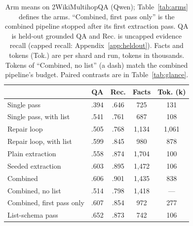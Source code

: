\begin{table}[!tb]
\centering
\caption{Arm means on 2WikiMultihopQA (Qwen); Table~\ref{tab:arms} defines the arms. ``Combined, first pass only'' is the combined pipeline stopped after its first extraction pass. QA is held-out grounded QA and Rec. is uncapped evidence recall (capped recall: Appendix~\ref{app:heldout}). Facts and tokens (Tok.) are per shard and run, tokens in thousands. Tokens of ``Combined, no list'' (a dash) match the combined pipeline's budget. Paired contrasts are in Table~\ref{tab:glance}.}
\label{tab:exp8}
\footnotesize\setlength{\tabcolsep}{2.5pt}
\begin{tabular}{lcccc}
\toprule
 & QA & Rec. & Facts & Tok. (k) \\
\midrule
Single pass & .394 & .646 & 725 & 131 \\
Single pass, with list & .541 & .761 & 687 & 108 \\
Repair loop & .505 & .768 & 1,134 & 1,061 \\
Repair loop, with list & .599 & .845 & 980 & 878 \\
Plain extraction & .558 & .874 & 1,704 & 100 \\
Seeded extraction & .603 & .895 & 1,472 & 106 \\
Combined & .606 & .901 & 1,435 & 838 \\
Combined, no list & .514 & .798 & 1,418 & --- \\
Combined, first pass only & .607 & .854 & 972 & 277 \\
List-schema pass & .652 & .873 & 742 & 106 \\
\bottomrule
\end{tabular}
\end{table}

